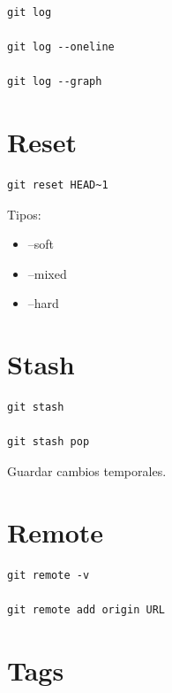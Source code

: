 \documentclass[a4paper,11pt]{article}
\begin{document}
\begin{lstlisting}
git log

git log --oneline

git log --graph
\end{lstlisting}


\section*{Reset}

\begin{lstlisting}
git reset HEAD~1
\end{lstlisting}

Tipos:
\begin{itemize}
    \item --soft
    \item --mixed
    \item --hard
\end{itemize}


\section*{Stash}

\begin{lstlisting}
git stash

git stash pop
\end{lstlisting}

Guardar cambios temporales.


\section*{Remote}

\begin{lstlisting}
git remote -v

git remote add origin URL
\end{lstlisting}


\section*{Tags}
\end{document}
